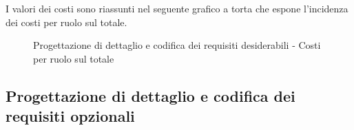 				\noindent
				I valori dei costi sono riassunti nel seguente grafico a torta che espone l’incidenza dei costi per ruolo sul totale.
				\begin{center}
					\begin{figure}[htbp]
					\vspace{0.8cm}
					\caption{Progettazione di dettaglio e codifica dei requisiti desiderabili - Costi per ruolo sul totale}
					\end{figure}
				\end{center}
		
	
	\subsection{Progettazione di dettaglio e codifica dei requisiti opzionali} %
	\label{sub:progettazione_di_dettaglio_e_codifica_dei_requisiti_opzionali}
